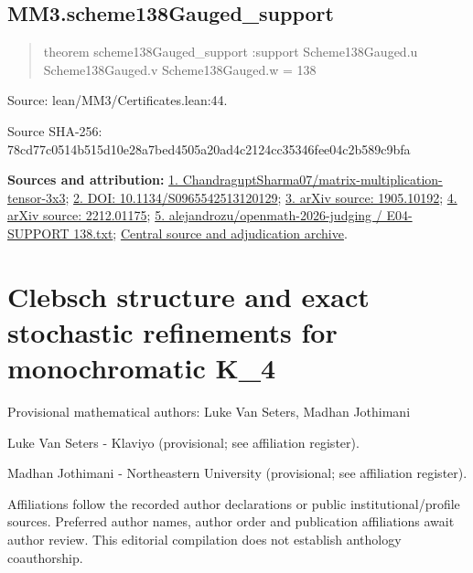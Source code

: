 \documentclass[11pt,a4paper]{article}
\begin{document}
\begin{samepage}
\subsection{MM3.scheme138Gauged\_support}
\begin{quote}\small\ttfamily theorem scheme138Gauged\_support :\newline     support Scheme138Gauged.u Scheme138Gauged.v Scheme138Gauged.w = 138\end{quote}
{\small Source: lean/MM3/Certificates.lean:44.\par}

{\small Source SHA-256: 78cd77c0514b515d10e28a7bed4505a20ad4c2124cc35346fee04c2b589c9bfa\par}

{\small\textbf{Sources and attribution:} \href{https://github.com/ChandraguptSharma07/matrix-multiplication-tensor-3x3/tree/479c2416b6261ee841052eef4881df0e40054f3f}{1. ChandraguptSharma07/matrix-multiplication-tensor-3x3}; \href{https://doi.org/10.1134/S0965542513120129}{2. DOI: 10.1134/S0965542513120129}; \href{https://arxiv.org/abs/1905.10192}{3. arXiv source: 1905.10192}; \href{https://arxiv.org/abs/2212.01175}{4. arXiv source: 2212.01175}; \href{https://github.com/alejandrozu/openmath-2026-judging/blob/d0ed487f487fa7ec814ff705ab55249983fe8707/OpenMath-Judging/review/entries/E04-SUPPORT138.txt}{5. alejandrozu/openmath-2026-judging / E04-SUPPORT 138.txt}; \href{https://github.com/alejandrozu/openmath-2026-judging}{Central source and adjudication archive}.\par}

\end{samepage}
\clearpage
\section{Clebsch structure and exact stochastic refinements for monochromatic K\_4}
{\small Provisional mathematical authors: Luke Van Seters, Madhan Jothimani\par}\medskip
{\small Luke Van Seters  -  Klaviyo (provisional; see affiliation register).\par}

{\small Madhan Jothimani  -  Northeastern University (provisional; see affiliation register).\par}

{\small Affiliations follow the recorded author declarations or public institutional/profile sources. Preferred author names, author order and publication affiliations await author review. This editorial compilation does not establish anthology coauthorship.\par}
\end{document}
